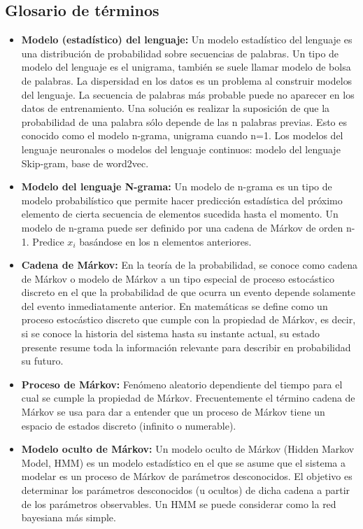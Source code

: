 \documentclass[spanish,12pt, a4paper,twoside]{paper}
\begin{document}
\subsection*{Glosario de términos}\label{sec:glosariodeterminos}
\begin{itemize}
	\item \textbf{Modelo (estadístico) del lenguaje:} Un modelo estadístico del lenguaje es una distribución de probabilidad sobre secuencias de palabras. Un tipo de modelo del lenguaje es el unigrama, también se suele llamar modelo de bolsa de palabras. La dispersidad en los datos es un problema al construir modelos del lenguaje. La secuencia de palabras más probable puede no aparecer en los datos de entrenamiento. Una solución es realizar la suposición de que la probabilidad de una palabra sólo depende de las n palabras previas. Esto es conocido como el modelo n-grama, unigrama cuando n=1. Los modelos del lenguaje neuronales o modelos del lenguaje continuos: modelo del lenguaje Skip-gram, base de word2vec.
	\item \textbf{Modelo del lenguaje N-grama:} Un modelo de n-grama es un tipo de modelo probabilístico que permite hacer predicción estadística del próximo elemento de cierta secuencia de elementos sucedida hasta el momento. Un modelo de n-grama puede ser definido por una cadena de Márkov de orden n-1. Predice $x_i$ basándose en los n elementos anteriores. 
	\item \textbf{Cadena de Márkov:} En la teoría de la probabilidad, se conoce como cadena de Márkov o modelo de Márkov a un tipo especial de proceso estocástico discreto en el que la probabilidad de que ocurra un evento depende solamente del evento inmediatamente anterior. En matemáticas se define como un proceso estocástico discreto que cumple con la propiedad de Márkov, es decir, si se conoce la historia del sistema hasta su instante actual, su estado presente resume toda la información relevante para describir en probabilidad su futuro.
	\item \textbf{Proceso de Márkov:} Fenómeno aleatorio dependiente del tiempo para el cual se cumple la propiedad de Márkov. Frecuentemente el término cadena de Márkov se usa para dar a entender que un proceso de Márkov tiene un espacio de estados discreto (infinito o numerable).
	\item \textbf{Modelo oculto de Márkov:} Un modelo oculto de Márkov (Hidden Markov Model, HMM) es un modelo estadístico en el que se asume que el sistema a modelar es un proceso de Márkov de parámetros desconocidos. El objetivo es determinar los parámetros desconocidos (u ocultos) de dicha cadena a partir de los parámetros observables. Un HMM se puede considerar como la red bayesiana más simple. 

\end{itemize}
\end{document}
